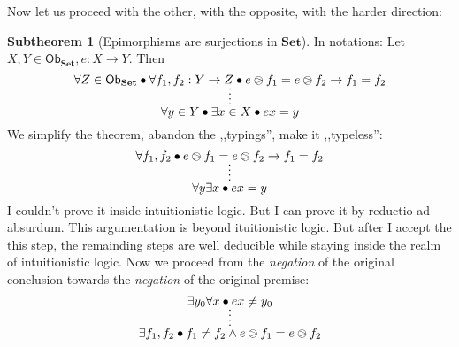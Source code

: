 \documentclass{article}
\newcommand{\obSet}{\ob_{\setCat}}
\newcommand{\ob}{\mathsf{Ob}}
\newcommand{\setCat}{\mathbf{Set}}
\theoremstyle{definition}
\newtheorem{sth}{Subtheorem}[thm]
\begin{document}
	Now let us proceed with the other, with the opposite, with the harder direction:

	\begin{sth}[Epimorphisms are surjections in $\setCat$]

		In notations: Let $X, Y \in \obSet, e: X \to Y$. Then
		\[
			\infer*{
				\forall y \in Y \bullet \exists x \in X \bullet ex = y
			}
			{
				\forall Z \in \obSet \bullet \forall f_1, f_2: Y \to Z \bullet e\ogreaterthan f_1 = e\ogreaterthan f_2 \to f_1 = f_2
			}
		\]
		We simplify the theorem, abandon the ,,typings'', make it ,,typeless'':
		\[
			\infer*{
				\forall y \exists x \bullet ex = y
			}
			{
				\forall f_1, f_2 \bullet e\ogreaterthan f_1 = e\ogreaterthan f_2 \to f_1 = f_2
			}
		\]
		I couldn't prove it inside intuitionistic logic. But I can prove it by reductio ad absurdum. This argumentation is beyond ituitionistic logic.
		But after I accept the this step, the remainding steps are well deducible while staying inside the realm of intuitionistic logic.
		Now we proceed from the \emph{negation} of the original conclusion towards the \emph{negation} of the original premise:
		\[
			\infer*{
				\exists f_1, f_2 \bullet f_1 \neq f_2 \land e\ogreaterthan f_1 = e\ogreaterthan f_2
			}
			{
				\exists y_0 \forall x \bullet ex \neq y_0
			}
		\]
	\end{sth}
\end{document}

